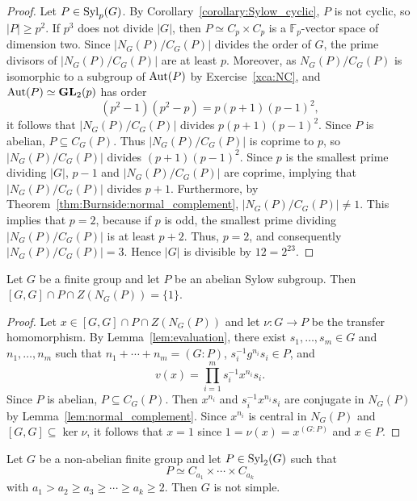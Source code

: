 \begin{proof}
	Let $P\in\mathrm{Syl}_p(G)$. By Corollary~\ref{corollary:Sylow_cyclic}, $P$ is not cyclic, so $|P|\geq p^2$. If $p^3$ does not divide $|G|$, then $P\simeq C_p\times C_p$ is a $\mathbb{F}_p$-vector space of dimension two. Since $|N_G(P)/C_G(P)|$ divides the order of $G$, the prime divisors of $|N_G(P)/C_G(P)|$ are at least $p$. Moreover, as $N_G(P)/C_G(P)$ is isomorphic to a subgroup of $\operatorname{Aut}(P)$ by Exercise~\ref{xca:NC}, and $\operatorname{Aut}(P)\simeq\mathbf{GL}_2(p)$ has order 
    \[
    (p^2-1)(p^2-p)=p(p+1)(p-1)^2,
    \]
    it follows that $|N_G(P)/C_G(P)|$ divides $p(p+1)(p-1)^2$. Since $P$ is abelian, $P\subseteq C_G(P)$. Thus $|N_G(P)/C_G(P)|$ is coprime to $p$, so $|N_G(P)/C_G(P)|$ divides $(p+1)(p-1)^2$. Since $p$ is the smallest prime dividing $|G|$, $p-1$ and $|N_G(P)/C_G(P)|$ are coprime, implying that $|N_G(P)/C_G(P)|$ divides $p+1$. Furthermore, by Theorem~\ref{thm:Burnside:normal_complement}, $|N_G(P)/C_G(P)|\ne1$. This implies that $p=2$, because if $p$ is odd, the smallest prime dividing $|N_G(P)/C_G(P)|$ is at least $p+2$. Thus, $p=2$, and consequently $|N_G(P)/C_G(P)|=3$. Hence $|G|$ is divisible by $12=2^23$.
\end{proof}

\begin{theorem}
	\label{theorem:[GG]PZNG(P)=1}
	Let $G$ be a finite group and let $P$ be an abelian Sylow subgroup. Then $[G,G]\cap P\cap Z(N_G(P))=\{1\}$.
\end{theorem}

\begin{proof}
	Let $x\in [G,G]\cap P\cap Z(N_G(P))$ and let $\nu\colon G\to P$ be the transfer homomorphism. By Lemma~\ref{lem:evaluation}, there exist $s_1,\dots,s_m\in G$ and $n_1,\dots,n_m$ such that $n_1+\cdots+n_m=(G:P)$, $s_i^{-1}g^{n_i}s_i\in P$, and 
	\[
		v(x)=\prod_{i=1}^m s_i^{-1}x^{n_i}s_i.
	\]
	Since $P$ is abelian, $P\subseteq C_G(P)$. Then $x^{n_i}$ and $s_i^{-1}x^{n_i}s_i$ are conjugate in $N_G(P)$ by Lemma~\ref{lem:normal_complement}. Since $x^{n_i}$ is central in $N_G(P)$ and $[G,G]\subseteq\ker\nu$, it follows that $x=1$ since $1=\nu(x)=x^{(G:P)}$ and $x\in P$.
\end{proof}

\begin{corollary}
	Let $G$ be a non-abelian finite group and let $P\in\mathrm{Syl}_2(G)$ such that \[
    P\simeq C_{a_1}\times\cdots\times C_{a_k}
    \]
    with $a_1>a_2\geq a_3\geq\cdots\geq a_k\geq 2$. Then $G$ is not simple. 
\end{corollary}

